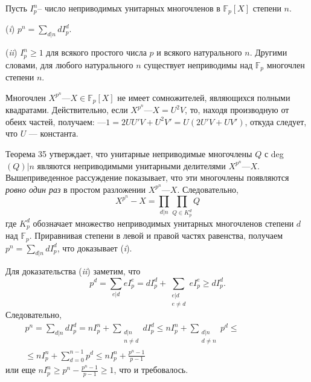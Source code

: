 \begin{sled}
\hspace*{15pt}Пусть $I^n_p$-- число неприводимых унитарных многочленов в $\mathbb{F}_p[X]$
степени $n$.

\newpage

\hspace*{15pt}(\textit{i}) $p^n = \sum\limits_{d|n}dI^d_p$.

\hspace*{15pt}(\textit{ii}) $I^n_p \geqslant 1$ для всякого простого числа $p$ и всякого натурального $n$.
Другими словами, для любого натурального $n$ существует неприводимы над $\mathbb{F}_p$ многочлен степени $n$.\newline
\end{sled}

\begin{myproof}
Многочлен $X^{p^n} — X \in \mathbb{F}_p[X]$ не имеет сомножителей, являющихся 
полными квадратами. Действительно, если $X^{p^n} — X = U^2V$, то, 
находя производную от обеих частей, получаем: $— 1 = 2UU'V + 
U^2V' = U(2U'V + UV')$, откуда следует, что $U$ — константа.
 
\noindent Теорема 35 утверждает, что унитарные неприводимые многочлены 
$Q$ с deg$(Q) | n$ являются неприводимыми унитарными делителями 
$X^{p^n} — X$. Вышеприведенное рассуждение показывает, что эти  
многочлены появляются \textit{ровно один раз} в простом разложении $X^{p^n} — X$. 
Следовательно,
\begin{equation*}
X^{p^n} - X =  \prod_{d|n} \prod_{Q\in K^d_p}Q
\end{equation*}
где $K^d_p$ обозначает множество неприводимых унитарных  
многочленов степени $d$ над $\mathbb{F}_p$. Приравнивая степени в левой и правой частях 
равенства, получаем $p^n = \sum_{d|n} dI^d_p$, что доказывает (\textit{i}). 

\noindent Для доказательства (\textit{ii}) заметим, что
\begin{equation*}
p^d = \sum_{e|d}eI^e_p = dI^d_p + \sum_{\substack{e|d{}\\e\neq d}}eI^e_p \geqslant dI^d_p.
\end{equation*}
Следовательно,
\begin{eqnarray*}
p^n = \sum_{d|n}dI^d_p = nI^n_p + \sum_{\substack{d|n\\n\neq d}}dI^d_p \leqslant nI^n_p + \sum_{\substack{d|n{}\\d\neq n}}p^d \leqslant \qquad\qquad\qquad\\
\leqslant nI^n_p + \sum^{n-1}_{d = 0}p^d \leqslant nI^n_p + \frac{p^n - 1}{p - 1}\:\:
\end{eqnarray*}
или еще $nI^n_p \geqslant p^n - \frac{p^n - 1}{p - 1} \geqslant 1$, что и требовалось.
\end{myproof}
\newpage

